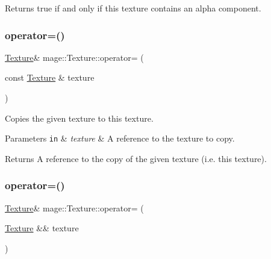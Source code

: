 \begin{DoxyReturn}{Returns}
{\ttfamily true} if and only if this texture contains an alpha component. 
\end{DoxyReturn}
\hypertarget{classmage_1_1_texture_a0b73b4df98d729c8f60e58b0ca065636}{}\label{classmage_1_1_texture_a0b73b4df98d729c8f60e58b0ca065636} 
\subsubsection{\texorpdfstring{operator=()}{operator=()}\hspace{0.1cm}{\footnotesize\ttfamily [1/2]}}
{\footnotesize\ttfamily \hyperlink{classmage_1_1_texture}{Texture}\& mage\+::\+Texture\+::operator= (\begin{DoxyParamCaption}\item[{const \hyperlink{classmage_1_1_texture}{Texture} \&}]{texture }\end{DoxyParamCaption})\hspace{0.3cm}{\ttfamily [delete]}}

Copies the given texture to this texture.


\begin{DoxyParams}[1]{Parameters}
\mbox{\tt in}  & {\em texture} & A reference to the texture to copy. \\
\hline
\end{DoxyParams}
\begin{DoxyReturn}{Returns}
A reference to the copy of the given texture (i.\+e. this texture). 
\end{DoxyReturn}
\hypertarget{classmage_1_1_texture_a765e9cf3bddedbe2795dea0fe57245ff}{}\label{classmage_1_1_texture_a765e9cf3bddedbe2795dea0fe57245ff} 
\subsubsection{\texorpdfstring{operator=()}{operator=()}\hspace{0.1cm}{\footnotesize\ttfamily [2/2]}}
{\footnotesize\ttfamily \hyperlink{classmage_1_1_texture}{Texture}\& mage\+::\+Texture\+::operator= (\begin{DoxyParamCaption}\item[{\hyperlink{classmage_1_1_texture}{Texture} \&\&}]{texture }\end{DoxyParamCaption})\hspace{0.3cm}{\ttfamily [delete]}}

